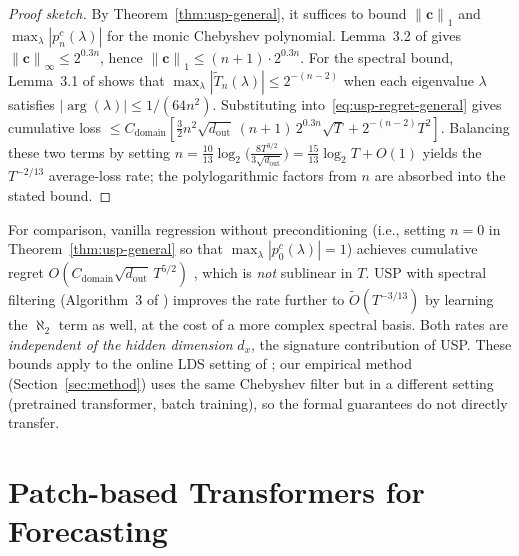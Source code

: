 \documentclass[11pt]{article}
\theoremstyle{plain}
\theoremstyle{definition}
\theoremstyle{remark}
\newcommand{\norm}[1]{\left\lVert#1\right\rVert}
\newcommand{\abs}[1]{\left\lvert#1\right\rvert}
\begin{document}
\begin{proof}[Proof sketch]
By Theorem~\ref{thm:usp-general}, it suffices to bound $\norm{\boldsymbol{c}}_1$ and $\max_\lambda \abs{p_n^c(\lambda)}$ for the monic Chebyshev polynomial. Lemma~3.2 of \citet{marsden2024universal} gives $\norm{\boldsymbol{c}}_\infty \leq 2^{0.3n}$, hence $\norm{\boldsymbol{c}}_1 \leq (n+1) \cdot 2^{0.3n}$. For the spectral bound, Lemma~3.1 of \citet{marsden2024universal} shows that $\max_\lambda \abs{\tilde T_n(\lambda)} \leq 2^{-(n-2)}$ when each eigenvalue $\lambda$ satisfies $\abs{\arg(\lambda)} \leq 1/(64n^2)$. Substituting into~\eqref{eq:usp-regret-general} gives cumulative loss $\leq C_{\mathrm{domain}}[\tfrac{3}{2} n^2 \sqrt{d_{\mathrm{out}}}\,(n{+}1)\,2^{0.3n}\sqrt{T} + 2^{-(n-2)} T^2]$. Balancing these two terms by setting $n = \tfrac{10}{13}\log_2\!\bigl(\tfrac{8 T^{3/2}}{3\sqrt{d_{\mathrm{out}}}}\bigr) = \tfrac{15}{13}\log_2 T + O(1)$ yields the $T^{-2/13}$ average-loss rate; the polylogarithmic factors from $n$ are absorbed into the stated bound.
\end{proof}

\noindent For comparison, vanilla regression without preconditioning (i.e., setting $n = 0$ in Theorem~\ref{thm:usp-general} so that $\max_\lambda \abs{p_0^c(\lambda)} = 1$) achieves cumulative regret $O(C_{\mathrm{domain}} \sqrt{d_{\mathrm{out}}}\, T^{5/2})$ \citep[p.~5]{marsden2024universal}, which is \emph{not} sublinear in $T$. USP with spectral filtering (Algorithm~3 of \citet{marsden2024universal}) improves the rate further to $\tilde O(T^{-3/13})$ by learning the $\aleph_2$ term as well, at the cost of a more complex spectral basis. Both rates are \emph{independent of the hidden dimension} $d_x$, the signature contribution of USP. These bounds apply to the online LDS setting of \citet{marsden2024universal}; our empirical method (Section~\ref{sec:method}) uses the same Chebyshev filter but in a different setting (pretrained transformer, batch training), so the formal guarantees do not directly transfer.

\section{Patch-based Transformers for Forecasting}
\label{sec:patch-transformers}
\end{document}
